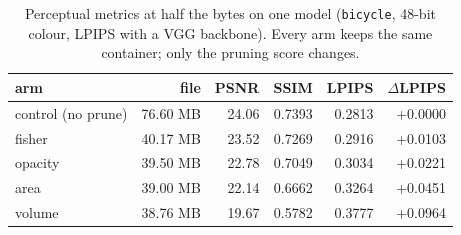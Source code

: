 \begin{table}[t]
\centering
\small
\footnotesize
\setlength{\tabcolsep}{2.8pt}
\caption{Perceptual metrics at half the bytes on one model (\texttt{bicycle}, 48-bit colour, LPIPS with a VGG backbone). Every arm keeps the same container; only the pruning score changes.}
\label{tab:perceptual}
\begin{tabular}{lrrrrr}
\toprule
arm & file & PSNR & SSIM & LPIPS & $\Delta$LPIPS \\
\midrule
control (no prune) & 76.60 MB & 24.06 & 0.7393 & 0.2813 & +0.0000 \\
fisher & 40.17 MB & 23.52 & 0.7269 & 0.2916 & +0.0103 \\
opacity & 39.50 MB & 22.78 & 0.7049 & 0.3034 & +0.0221 \\
area & 39.00 MB & 22.14 & 0.6662 & 0.3264 & +0.0451 \\
volume & 38.76 MB & 19.67 & 0.5782 & 0.3777 & +0.0964 \\
\bottomrule
\end{tabular}
\end{table}
